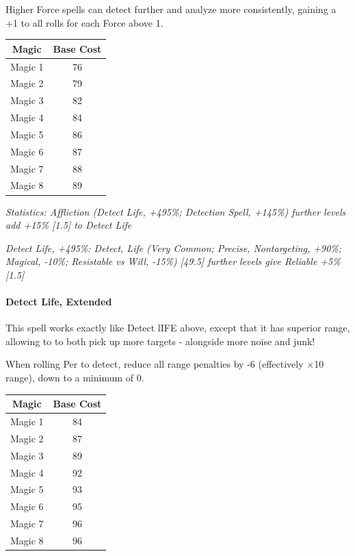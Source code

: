 \begin{multicols*}{3}
	Higher Force spells can detect further and analyze more consistently, gaining a +1 to all rolls for each Force above 1.	
	
	\begin{center}
		\begin{tabular}{|c|c|}
			\hline
			Magic & Base Cost \\
			\hline
			\hline
			Magic 1 & 76 \\
			Magic 2 & 79 \\
			Magic 3 & 82 \\
			Magic 4 & 84 \\
			Magic 5 & 86 \\
			Magic 6 & 87 \\
			Magic 7 & 88 \\
			Magic 8 & 89 \\
			\hline
		\end{tabular}
	\end{center} 	
	
	\textcolor{OliveGreen}{\textit{ Statistics: Affliction (Detect Life, +495\%; Detection Spell, +145\%) further levels add +15\% [1.5] to Detect Life}}
	
	\textcolor{OliveGreen}{\textit{Detect Life, +495\%: Detect, Life (Very Common; Precise, Nontargeting, +90\%; Magical, -10\%; Resistable vs Will, -15\%) [49.5] further levels give Reliable +5\% [1.5]}}
	
	\paragraph{Detect Life, Extended}
	
	This spell works exactly like Detect lIFE above, except that it has superior range, allowing to to both pick up more targets - alongside more noise and junk!
	
	When rolling Per to detect, reduce all range penalties by -6 (effectively $\times$10 range), down to a minimum of 0.
	
	\begin{center}
		\begin{tabular}{|c|c|}
			\hline
			Magic & Base Cost \\
			\hline
			\hline
			Magic 1 & 84 \\
			Magic 2 & 87 \\
			Magic 3 & 89 \\
			Magic 4 & 92 \\
			Magic 5 & 93 \\
			Magic 6 & 95 \\
			Magic 7 & 96 \\
			Magic 8 & 96 \\
			\hline
		\end{tabular}
	\end{center} 
	

\end{multicols*}
